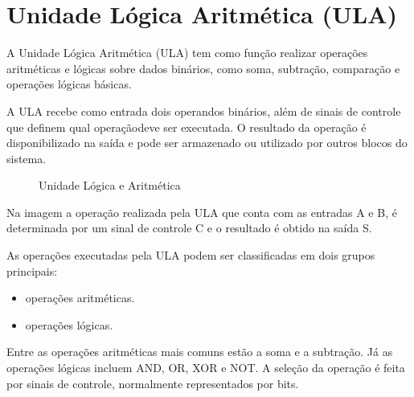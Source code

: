 \documentclass[12pt]{article}
\begin{document}
\newpage
\section{Unidade Lógica Aritmética (ULA)}
A Unidade Lógica Aritmética (ULA) tem como função realizar operações aritméticas e lógicas sobre dados binários,
como soma, subtração, comparação e operações lógicas básicas.


A ULA recebe como entrada dois operandos binários, além de sinais de controle que definem qual operaçãodeve ser executada.
O resultado da operação é disponibilizado na saída e pode ser armazenado ou utilizado por outros blocos do sistema.

\begin{figure}[h]
\centering


\caption{Unidade Lógica e Aritmética}
\label{fig:ula}
\end{figure}


Na imagem a operação realizada pela ULA que conta com as entradas A e B, é determinada por um sinal de controle C e o resultado é obtido na saída S.

As operações executadas pela ULA podem ser classificadas em dois grupos principais: 
\begin{itemize}
\item operações aritméticas.
\item operações lógicas.
\end{itemize}

Entre as operações aritméticas mais comuns estão a soma e a subtração.
Já as operações lógicas incluem AND, OR, XOR e NOT.
A seleção da operação é feita por sinais de controle, normalmente representados por bits.
\end{document}
